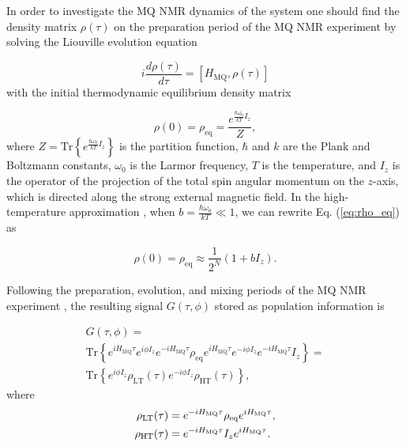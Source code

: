 In order to investigate the MQ NMR dynamics of the system one should find the density matrix $\rho(\tau)$ on the preparation period of the MQ NMR experiment \cite{mq_nmr_experiment} by solving the Liouville evolution equation \cite{lab:mq_mnr_qinfo_2012}

\begin{equation}
    \label{eq:liouvile}
    i \dfrac{d\rho(\tau)}{d \tau} = 
    \left[H_\mathrm{MQ}, \rho(\tau)\right]
\end{equation}
with the initial thermodynamic equilibrium density matrix

\begin{equation}
    \label{eq:rho_eq}
    \rho(0) = \rho_{\mathrm{eq}} = 
    \dfrac{e^{\frac{\hbar\omega_{0}}{kT} I_z}}{Z},
\end{equation}
where $Z =\mathrm{Tr}\left\{e^{\frac{\hbar\omega_{0}}{kT} I_z}\right\}$ is the partition function, $\hbar$ and $k$ are the Plank and Boltzmann constants, $\omega_0$ is the Larmor frequency, $T$ is the temperature, and $I_z$ is the operator of the projection of the total spin angular momentum on the $z$-axis, which is directed along the strong external magnetic field. In the high-temperature approximation \cite{Goldman}, when $b = \frac{\hbar\omega_{0}}{kT} \ll 1$, we can rewrite Eq.   (\ref{eq:rho_eq}) as 

\begin{equation}
    \label{eq:rho_ht}
    \rho(0) = \rho_{\mathrm{eq}} \approx
    \dfrac{1}{2^N} (1 + bI_z).
\end{equation}

Following the preparation, evolution, and mixing periods of the MQ NMR experiment \cite{mq_nmr_experiment}, the resulting signal $G(\tau, \phi)$ stored as population information is \cite{lab:low_temp_dyn_1997}

\begin{multline}
    \label{eq:signal}
     G(\tau, \phi) = \\ 
     \mathrm{Tr}\left\{
         e^{iH_\mathrm{MQ}\tau} e^{i\phi I_z} e^{-iH_\mathrm{MQ}\tau}
         \rho_\mathrm{eq}
         e^{iH_\mathrm{MQ}\tau} e^{-i\phi I_z} e^{-iH_\mathrm{MQ}\tau}
         I_z \right\} = \\
    \mathrm{Tr}\left\{e^{i\phi I_z} \rho_\mathrm{LT} (\tau)
              e^{-i\phi I_z} \rho_\mathrm{HT} (\tau) \right\},
\end{multline}
where
\begin{align}
    \label{eq:eval_rho}
    \rho_\mathrm{LT} (\tau) & = e^{-iH_\mathrm{MQ}\tau} \rho_\mathrm{eq} e^{iH_\mathrm{MQ}\tau},
    \notag\\
    \rho_\mathrm{HT} (\tau) & =  e^{-iH_\mathrm{MQ}\tau} I_z e^{iH_\mathrm{MQ}\tau}.
\end{align}

